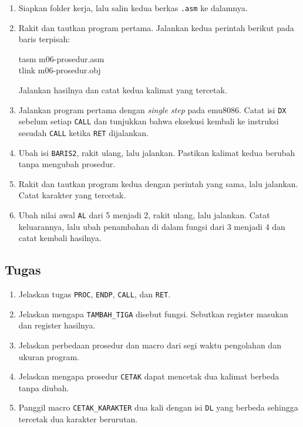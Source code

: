 \begin{enumerate}
    \item Siapkan folder kerja, lalu salin kedua berkas \texttt{.asm}
          ke dalamnya.
    \item Rakit dan tautkan program pertama. Jalankan kedua perintah
          berikut pada baris terpisah:
          \begin{perintah}
tasm m06-prosedur.asm\\
tlink m06-prosedur.obj
\end{perintah}
          Jalankan hasilnya dan catat kedua kalimat yang tercetak.
    \item Jalankan program pertama dengan \emph{single step} pada
          emu8086. Catat isi \texttt{DX} sebelum setiap \texttt{CALL}
          dan tunjukkan bahwa eksekusi kembali ke instruksi sesudah
          \texttt{CALL} ketika \texttt{RET} dijalankan.
    \item Ubah isi \texttt{BARIS2}, rakit ulang, lalu jalankan.
          Pastikan kalimat kedua berubah tanpa mengubah prosedur.
    \item Rakit dan tautkan program kedua dengan perintah yang sama,
          lalu jalankan. Catat karakter yang tercetak.
    \item Ubah nilai awal \texttt{AL} dari 5 menjadi 2, rakit ulang,
          lalu jalankan. Catat keluarannya, lalu ubah penambahan di
          dalam fungsi dari 3 menjadi 4 dan catat kembali hasilnya.
\end{enumerate}

\subsection{Tugas}

\begin{enumerate}
    \item Jelaskan tugas \texttt{PROC}, \texttt{ENDP}, \texttt{CALL},
          dan \texttt{RET}.
    \item Jelaskan mengapa \texttt{TAMBAH\_TIGA} disebut fungsi.
          Sebutkan register masukan dan register hasilnya.
    \item Jelaskan perbedaan prosedur dan macro dari segi waktu
          pengolahan dan ukuran program.
    \item Jelaskan mengapa prosedur \texttt{CETAK} dapat mencetak dua
          kalimat berbeda tanpa diubah.
    \item Panggil macro \texttt{CETAK\_KARAKTER} dua kali dengan isi
          \texttt{DL} yang berbeda sehingga tercetak dua karakter
          berurutan.
\end{enumerate}

